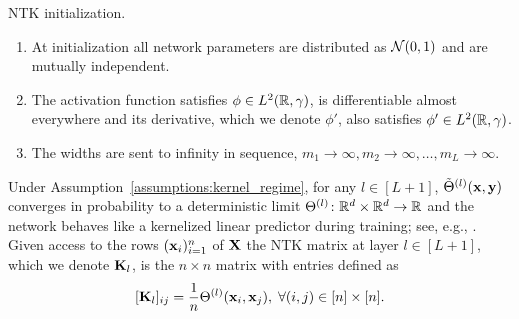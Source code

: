 \begin{assumption}\label{assumptions:kernel_regime}
NTK initialization. 
    \begin{enumerate}[leftmargin=*]
        \item At initialization all network parameters are distributed as $\mathcal{N}(0,1)$ and are mutually independent.
        \item The activation function satisfies $\phi \in L^2(\mathbb{R}, \gamma)$, is differentiable almost everywhere and its derivative, which we denote $\phi'$, also satisfies $\phi' \in L^2(\mathbb{R}, \gamma)$.
        \item The widths are sent to infinity in sequence, $m_1 \rightarrow \infty, m_2 \rightarrow \infty, \ldots, m_{L}\rightarrow \infty$. %
    \end{enumerate}
\end{assumption}
Under Assumption~\ref{assumptions:kernel_regime}, for any $l \in [L+1]$, $\tilde{\Theta}^{(l)}(\mathbf x, \mathbf y)$ converges in probability to a deterministic limit $\Theta^{(l)}\colon \mathbb{R}^d \times \mathbb{R}^d \rightarrow \mathbb{R}$ \citep{jacot_ntk} and the network behaves like a kernelized linear predictor during training; see, e.g., \cite{arora_exact_comp, Lee2019WideNN-SHORT, pmlr-v125-woodworth20a}. Given access to the rows $(\mathbf x_i)_{i=1}^n$ of $\mathbf{X}$ the NTK matrix at layer $l\in [L+1]$, which we denote $\mathbf{K}_{l}$, is the $n \times n$ matrix with entries defined as 
\begin{equation} \label{eq:ntk_matrix_def}
[\mathbf{K}_{l}]_{ij} = \frac{1}{n}\Theta^{(l)}(\mathbf x_i, \mathbf x_j), \; \forall (i,j) \in [n] \times [n].
\end{equation}

